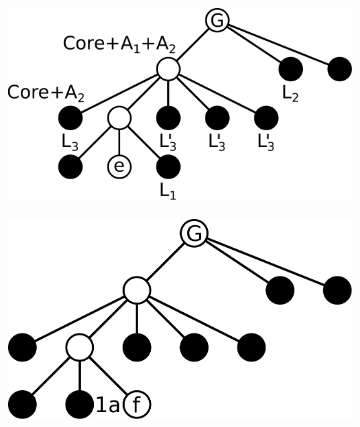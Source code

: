 \begin{figure}\centering%
    \begin{subfigure}{0.240\linewidth}\centering
        \includegraphics[height=\myMinHeight]{../../img/svg/seq_proof_figs_a}
        \caption{}\label{fig:seq_proof:a}
    \end{subfigure}%
    \hfill
    \begin{subfigure}{0.24\linewidth}\centering
        \includegraphics[height=\myMinHeight]{../../img/svg/seq_proof_figs_b}

\end{subfigure}
\end{figure}
